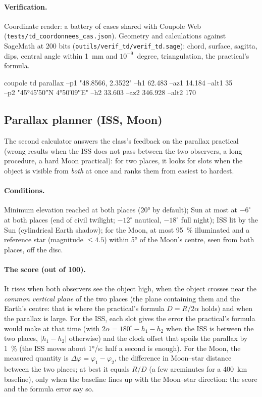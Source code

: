 \paragraph{Verification.} Coordinate reader: a battery of cases shared with Coupole Web
(\texttt{tests/td\_coordonnees\_cas.json}). Geometry and calculations against SageMath at 200 bits
(\texttt{outils/verif\_td/verif\_td.sage}): chord, surface, sagitta, dips, central angle within 1~mm and
$10^{-9}$~degree, triangulation, the practical's formula.

\begin{ccode}
coupole td parallax --p1 "48.8566, 2.3522" --h1 62.483 --az1 14.184 --alt1 35\\
\hspace*{2em}--p2 "45°45′50″N 4°50′09″E" --h2 33.603 --az2 346.928 --alt2 170
\end{ccode}

\subsection{Parallax planner (ISS, Moon)}\label{sec:td-planif}
The second calculator answers the class's feedback on the parallax practical (wrong results when the ISS does not pass
between the two observers, a long procedure, a hard Moon practical): for two places, it looks for slots when the
object is visible from \emph{both} at once and ranks them from easiest to hardest.

\paragraph{Conditions.} Minimum elevation reached at both places (20° by default); Sun at most at $-6^\circ$ at both places
(end of civil twilight; $-12^\circ$ nautical, $-18^\circ$ full night); ISS lit by the Sun (cylindrical Earth shadow); for the
Moon, at most 95~\% illuminated and a reference star (magnitude $\le 4.5$) within 5° of the Moon's centre, seen from
both places, off the disc.

\paragraph{The score (out of 100).} It rises when both observers see the object high, when the object crosses near
the \emph{common vertical plane} of the two places (the plane containing them and the Earth's centre: that is where
the practical's formula $D = R/2\alpha$ holds) and when the parallax is large. For the ISS, each slot gives the error
the practical's formula would make at that time (with $2\alpha = 180^\circ - h_1 - h_2$ when the ISS is between the two
places, $\lvert h_1 - h_2\rvert$ otherwise) and the clock offset that spoils the parallax by 1~\% (the ISS moves
about 1°/s: half a second is enough). For the Moon, the measured quantity is $\Delta\varphi = \varphi_1 -
\varphi_2$, the difference in Moon--star distance between the two places; at best it equals $R/D$ (a few arcminutes
for a 400~km baseline), only when the baseline lines up with the Moon--star direction: the score and the formula
error say so.

